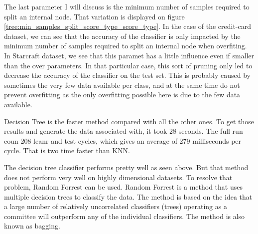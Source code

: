 \documentclass[10pt]{article}
\begin{document}
		The last parameter I will discuss is the minimum number of samples required to split an internal node. That variation is displayed on figure \ref{tree:min_samples_split_score_type_score_type}. In the case of the credit-card dataset, we can see that the accuracy of the classifier is only impacted by the minimum number of samples required to split an internal node when overfiting. In Starcraft dataset, we see that this paramet has a little influence even if smaller than the over parameters.  In that particular case, this sort of pruning only led to decrease the accuracy of the classifier on the test set. This is probably caused by sometimes the very few data available per class, and at the same time do not prevent overfitting as the only overfitting possible here is due to the few data available.

		Decision Tree is the faster method compared with all the other ones. To get those results and generate the data associated with, it took 28 seconds. The full run coun 208 leanr and test cycles, which gives an average of 279 milliseconds per cycle. That is two time faster than KNN.

		The decision tree classifier performs pretty well as seen above. But that method does not perform very well on highly dimensional datasets. To resolve that problem, Random Forrest can be used. Random Forrest is a method that uses multiple decision trees to classify the data. The method is based on the idea that a large number of relatively uncorrelated classifiers (trees) operating as a committee will outperform any of the individual classifiers. The method is also known as bagging.
\end{document}
